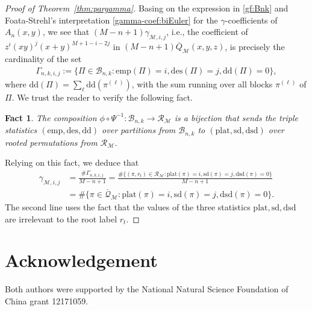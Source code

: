 \documentclass[11pt,reqno]{amsart}
\numberwithin{equation}{section}
\theoremstyle{plain}
\newtheorem{Fact}[theorem]{Fact}
\theoremstyle{definition}
\newcommand{\Q}{\mathcal{Q}}
\newcommand{\M}{\mathcal{M}}
\newcommand{\R}{\mathcal{R}}
\newcommand{\B}{\mathcal{B}}
\def\des{\mathrm{des}}
\def\plat{\mathrm{plat}}
\def\ddes{\mathrm{dd}}
\def\sdes{\mathrm{sd}}
\def\sddes{\mathrm{dsd}}
\def\emp{\mathrm{emp}}
\begin{document}
\begin{proof}[Proof of Theorem~\ref{thm:pargamma}]
Basing on the expression in \eqref{gf:Bnk} and Foata-Strehl's interpretation \eqref{gamma-coef:biEuler} for the $\gamma$-coefficients of $A_n(x,y)$, we see that $(M-n+1)\gamma_{\M,i,j}$, i.e., the coefficient of $z^i(xy)^j(x+y)^{M+1-i-2j}$ in $(M-n+1)\overline{Q}_{\M}(x,y,z)$, is precisely the cardinality of the set
\begin{align*}
\Gamma_{n,k,i,j}:=\{\Pi\in\B_{n,k}:\emp(\Pi)=i,\des(\Pi)=j,\ddes(\Pi)=0\},
\end{align*}
where $\ddes(\Pi)=\sum_{\ell}\ddes(\pi^{(\ell)})$, with the sum running over all blocks $\pi^{(\ell)}$ of $\Pi$. We trust the reader to verify the following fact.
\begin{Fact}
The composition $\phi\circ\Psi^{-1}:\B_{n,k}\rightarrow \R_{\M}$ is a bijection that sends the triple statistics $(\emp,\des,\ddes)$ over partitions from $\B_{n,k}$ to $(\plat,\sdes,\sddes)$ over rooted permutations from $\R_{\M}$.
\end{Fact}
Relying on this fact, we deduce that
\begin{align*}
\gamma_{\M,i,j} &= \frac{\# \Gamma_{n,k,i,j}}{M-n+1}= \frac{\# \{(\pi,r_t)\in\R_{\M}: \plat(\pi)=i,\sdes(\pi)=j,\sddes(\pi)=0\}}{M-n+1}\\
&= \#\{\pi\in\overline{\Q}_{\M}: \plat(\pi)=i,\sdes(\pi)=j,\sddes(\pi)=0\}.
\end{align*}
The second line uses the fact that the values of the three statistics $\plat,\sdes,\sddes$ are irrelevant to the root label $r_t$.
\end{proof}



\section*{Acknowledgement}
Both authors were supported by the National Natural Science Foundation of China grant 12171059.
\end{document}
